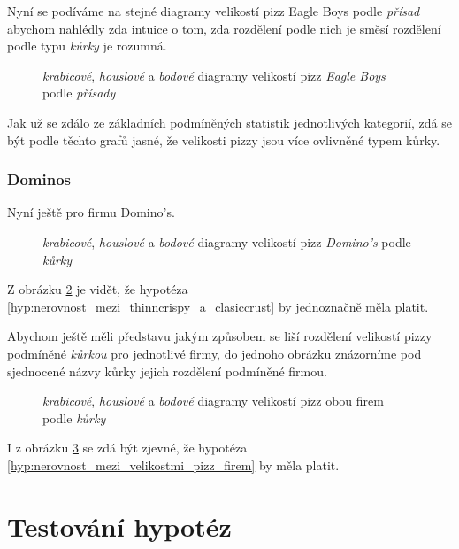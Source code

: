 \documentclass[czech]{article}
\begin{document}
Nyní se podíváme na stejné diagramy velikostí pizz Eagle Boys podle \emph{přísad} abychom
nahlédly zda intuice o tom, zda rozdělení podle nich je směsí rozdělení podle typu \emph{kůrky} je
rozumná.

\begin{figure}[H]
	\centering
	
	\caption{\emph{krabicové}, \emph{houslové} a \emph{bodové} diagramy velikostí pizz \emph{Eagle Boys} podle \emph{přísady}}
	\label{fig:eagleboys_topping_diagrams}
\end{figure}

Jak už se zdálo ze základních podmíněných statistik jednotlivých kategorií, zdá se být podle těchto
grafů jasné, že velikosti pizzy jsou více ovlivněné typem kůrky.

\subsubsection*{Dominos}%
\label{ssub:graficke_znazorneni_dominos}

Nyní ještě pro firmu Domino's.

\nopagebreak

\begin{figure}[H]
	\centering
	
	\caption{\emph{krabicové}, \emph{houslové} a \emph{bodové} diagramy velikostí pizz \emph{Domino's} podle \emph{kůrky}}
	\label{fig:dominos_crust_diagrams}
\end{figure}

Z obrázku \ref{fig:dominos_crust_diagrams} je vidět, že hypotéza
\ref{hyp:nerovnost_mezi_thinncrispy_a_clasiccrust} by jednoznačně měla platit.

Abychom ještě měli představu jakým způsobem se liší rozdělení velikostí pizzy podmíněné \emph{kůrkou} pro
jednotlivé firmy, do jednoho obrázku znázorníme pod sjednocené názvy kůrky jejich rozdělení
podmíněné firmou.

\begin{figure}[H]
	\centering
	
	\caption{\emph{krabicové}, \emph{houslové} a \emph{bodové} diagramy velikostí pizz obou firem podle \emph{kůrky}}
	\label{fig:stores_crust_diagrams}
\end{figure}

I z obrázku \ref{fig:stores_crust_diagrams} se zdá být zjevné, že hypotéza
\ref{hyp:nerovnost_mezi_velikostmi_pizz_firem} by měla platit.

\section{Testování hypotéz}%
\label{sec:testování_hypotéz}
\end{document}
